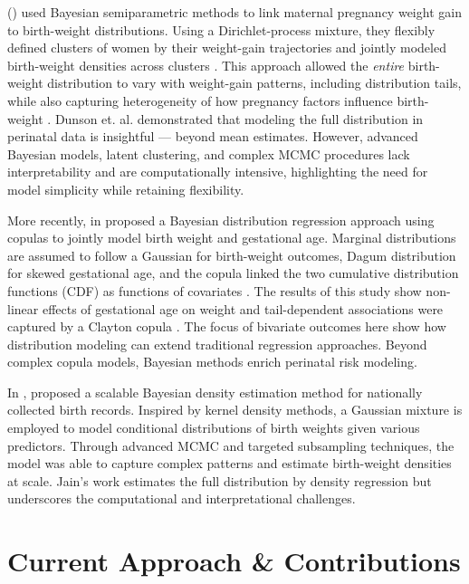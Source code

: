 \textcite{dunson2008} (\citeyear{dunson2008}) used Bayesian semiparametric methods to link maternal pregnancy weight gain to birth-weight distributions. Using a Dirichlet-process mixture, they flexibly defined clusters of women by their weight-gain trajectories and jointly modeled birth-weight densities across clusters \parencite{dunson2008}. This approach allowed the \emph{entire} birth-weight distribution to vary with weight-gain patterns, including distribution tails, while also capturing heterogeneity of how pregnancy factors influence birth-weight \parencite{dunson2008}. Dunson et. al. demonstrated that modeling the full distribution in perinatal data is insightful — beyond mean estimates. However, advanced Bayesian models, latent clustering, and complex MCMC procedures lack interpretability and are computationally intensive, highlighting the need for model simplicity while retaining flexibility.

More recently, \textcite{rathjens2023} in \citeyear{rathjens2023} proposed a Bayesian distribution regression approach using copulas to jointly model birth weight and gestational age. Marginal distributions are assumed to follow a Gaussian for birth-weight outcomes, Dagum distribution for skewed gestational age, and the copula linked the two cumulative distribution functions (CDF) as functions of covariates \parencite{rathjens2023}. The results of this study show non-linear effects of gestational age on weight and tail-dependent associations were captured by a Clayton copula \parencite{rathjens2023}. The focus of bivariate outcomes here show how distribution modeling can extend traditional regression approaches. Beyond complex copula models, Bayesian methods enrich perinatal risk modeling. 

In \citeyear{jain2024}, \textcite{jain2024} proposed a scalable Bayesian density estimation method for nationally collected birth records. Inspired by kernel density methods, a Gaussian mixture is employed to model conditional distributions of birth weights given various predictors. Through advanced MCMC and targeted subsampling techniques, the model was able to capture complex patterns and estimate birth-weight densities at scale. Jain's work estimates the full distribution by density regression but underscores the computational and interpretational challenges.

\section{Current Approach \& Contributions}
\label{sec:ch2-current-approach}

